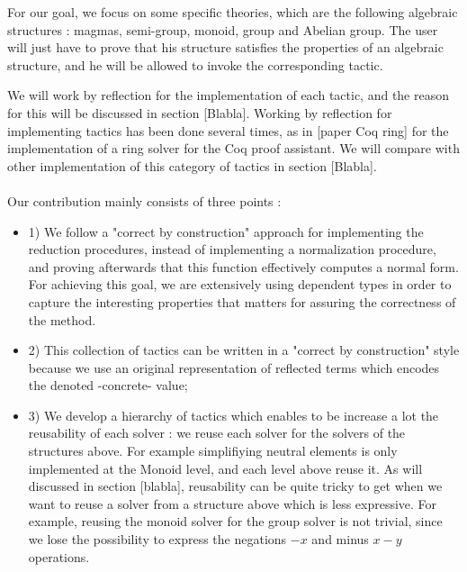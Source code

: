 For our goal, we focus on some specific theories, which are the following algebraic structures : magmas, semi-group, monoid, group and Abelian group.
The user will just have to prove that his structure satisfies the properties of an algebraic structure, and he will be allowed to invoke the corresponding tactic.

We will work by reflection for the implementation of each tactic, and the reason for this will be discussed in section [Blabla]. Working by reflection for implementing tactics has been done several times, as in [paper Coq ring] for the implementation of a ring solver for the Coq proof assistant. We will compare with other implementation of this category of tactics in section [Blabla]. \\
\\
Our contribution mainly consists of three points :
\begin{itemize}
	\item 1) We follow a "correct by construction" approach for implementing the reduction procedures, instead of implementing a normalization procedure, and proving afterwards that this function effectively computes a normal form. For achieving this goal, we are extensively using dependent types in order to capture the interesting properties that matters for assuring the correctness of the method. 
	\item 2) This collection of tactics can be written in a "correct by construction" style because we use an original representation of reflected terms which encodes the denoted -concrete- value;
	\item 3) We develop a hierarchy of tactics which enables to be increase a lot the reusability of each solver : we reuse each solver for the solvers of the structures above. For example simplifiying neutral elements is only implemented at the Monoid level, and each level above reuse it. As will discussed in section [blabla], reusability can be quite tricky to get when we want to reuse a solver from a structure above which is less expressive. For example, reusing the monoid solver for the group solver is not trivial, since we lose the possibility to express the negations $-x$ and minus $x-y$ operations.
\end{itemize}